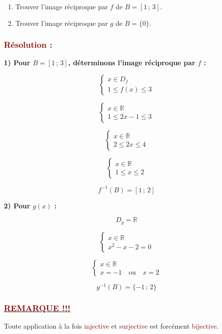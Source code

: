 \documentclass[12pt,a4paper]{article}
\begin{document}
\begin{enumerate}
    \item Trouver l'image réciproque par $f$ de $B=[1\,;\,3]$.

    \item Trouver l'image réciproque par $g$ de $B=\{0\}$.
\end{enumerate}

\subsubsection*{\textcolor{darkred}{Résolution :}}

\textbf{1) Pour $B=[1\,;\,3]$, déterminons l'image réciproque par $f$ :}

\[
\begin{cases}
x\in D_f\\
1\leq f(x)\leq3
\end{cases}
\]

\[
\begin{cases}
x\in\mathbb{R}\\
1\leq2x-1\leq3
\end{cases}
\]

\[
\begin{cases}
x\in\mathbb{R}\\
2\leq2x\leq4
\end{cases}
\]

\[
\begin{cases}
x\in\mathbb{R}\\
1\leq x\leq2
\end{cases}
\]

\[
\boxed{
f^{-1}(B)=[1\,;\,2]
}
\]

\textbf{2) Pour $g(x)$ :}

\[
D_g=\mathbb{R}
\]

\[
\begin{cases}
x\in\mathbb{R}\\
x^2-x-2=0
\end{cases}
\]

\[
\begin{cases}
x\in\mathbb{R}\\
x=-1\quad\text{ou}\quad x=2
\end{cases}
\]

\[
\boxed{
g^{-1}(B)=\{-1\,;\,2\}
}
\]

\subsubsection*{\underline{\textbf{\textcolor{darkred}{REMARQUE !!!}}}}

Toute application à la fois \textcolor{darkred}{injective} et
\textcolor{darkred}{surjective} est forcément \textcolor{darkred}{bijective}.
\end{document}
